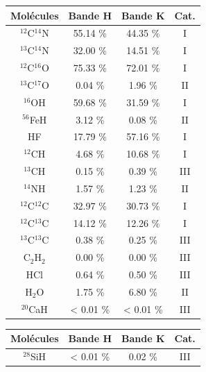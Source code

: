 \documentclass{article}
\begin{document}
\begin{table}[h!]
\vspace{0.3cm}
\begin{minipage}[t]{.4\linewidth}
\begin{center}
	\begin{tabular}{cccc}
        \hline
		\hline
        Molécules & Bande H & Bande K & Cat. \\
        \hline
        $^{12}$C$^{14}$N & 55.14 \% & 44.35 \% & I\\
        $^{13}$C$^{14}$N & 32.00 \%  & 14.51 \%& I \\
        $^{12}$C$^{16}$O & 75.33 \% & 72.01 \% & I\\
        $^{13}$C$^{17}$O & 0.04 \% & 1.96 \% & II\\
        $^{16}$OH & 59.68 \% & 31.59 \% & I\\
        $^{56}$FeH& 3.12 \% & 0.08 \% & II\\
        HF & 17.79 \%  & 57.16 \%  & I\\
        $^{12}$CH & 4.68 \% & 10.68 \% & I\\
        $^{13}$CH & 0.15 \% & 0.39 \% & III\\
        $^{14}$NH & 1.57 \% & 1.23 \% & II\\
        $^{12}$C$^{12}$C & 32.97 \% & 30.73 \%& I \\
        $^{12}$C$^{13}$C & 14.12 \% & 12.26 \% & I\\
        $^{13}$C$^{13}$C & 0.38 \% & 0.25 \% & III\\
        C$_2$H$_2$ &  0.00  \% & 0.00 \% & III\\
        HCl & 0.64 \% &  0.50 \% & III\\
		H$_2$O & 1.75 \% & 6.80 \% & II\\
        $^{20}$CaH & < 0.01  \% & < 0.01  \% & III\\
        \hline
    \end{tabular}
\end{center} 
\end{minipage} 
\hspace{2.cm}
\begin{minipage}[t]{.4\linewidth}
\begin{center}
   \begin{tabular}{cccc}
        \hline
		\hline
        Molécules & Bande H & Bande K & Cat. \\
        \hline
        $^{28}$SiH & < 0.01 \% & 0.02 \% & III\\

\end{tabular}
\end{center}
\end{minipage}
\end{table}
\end{document}
